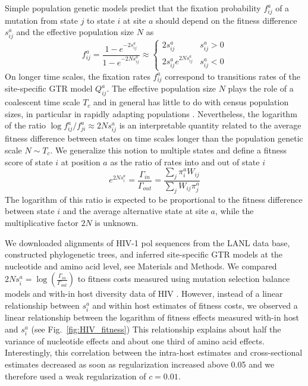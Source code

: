 \documentclass[aps,rmp,twocolumn,linenumbers]{revtex4-1}
\newcommand{\pc}{c}
\begin{document}
Simple population genetic models predict that the fixation probability $f_{ij}^a$ of a mutation from state $j$ to state $i$ at site $a$ should depend on the fitness difference $s^a_{ij}$ and the effective population size $N$ as \citep{kimura_diffusion_1964}
\begin{equation}
	f^a_{ij} = \frac{1-e^{-2s^a_{ij}}}{1-e^{-2Ns^a_{ij}}} \approx
	\begin{cases}
		2s^a_{ij} & s^a_{ij}>0 \\
		2s^a_{ij} e^{2Ns^a_{ij}} & s^a_{ij} < 0
	\end{cases}
\end{equation}
On longer time scales, the fixation rates $f^a_{ij}$ correspond to transitions rates of the site-specific GTR model $Q^a_{ij}$.
The effective population size $N$ plays the role of a coalescent time scale $T_c$ and in general has little to do with census population sizes, in particular in rapidly adapting populations \citep{neher_genetic_2013}.
Nevertheless, the logarithm of the ratio $\log f^a_{ij}/f^a_{ji} \approx 2Ns^a_{ij}$ is an interpretable quantity related to the average fitness difference between states on time scales longer than the population genetic scale $N\sim T_c$.
We generalize this notion to multiple states and define a fitness score of state $i$ at position $a$ as the ratio of rates into and out of state $i$
\begin{equation}
	e^{2N s_i^a} = \frac{\Gamma_{in}}{\Gamma_{out}} = \frac{\sum_j \pi_i^a W_{ij}}{\sum_j W_{ij}\pi_j^a}
\end{equation}
The logarithm of this ratio is expected to be proportional to the fitness difference between state $i$ and the average alternative state at site $a$, while the multiplicative factor $2N$ is unknown.


We downloaded alignments of HIV-1 pol sequences from the LANL data base, constructed phylogenetic trees, and inferred site-specific GTR models at the nucleotide and amino acid level, see Materials and Methods.
We compared $2N s_i^a = \log\left(\frac{\Gamma_{in}}{\Gamma_{out}}\right)$ to fitness costs measured using mutation selection balance models and with-in host diversity data of HIV \citep{zanini2017vivo}.
However, instead of a linear relationship between $s_i^a$ and within host estimates of fitness costs, we observed a linear relationship between the logarithm of fitness effects measured with-in host and $s_i^a$ (see Fig.~\ref{fig:HIV_fitness})
This relationship explains about half the variance of nucleotide effects and about one third of amino acid effects.
Interestingly, this correlation between the intra-host estimates and cross-sectional estimates decreased as soon as regularization increased above 0.05 and we therefore used a weak regularization of $\pc=0.01$.
\end{document}
